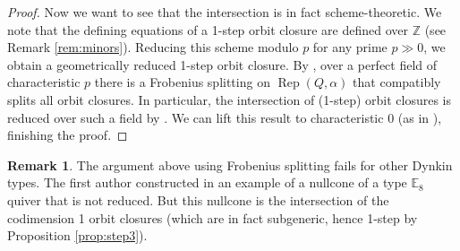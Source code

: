 \documentclass[twoside]{article}
\newcommand{\integ}{\mathbb{Z}}
\newcommand{\Rep}{\operatorname{Rep}}
\theoremstyle{definition}
\newtheorem{remark}[theorem]{Remark}
\begin{document}
\begin{proof}
Now we want to see that the intersection is in fact scheme-theoretic. We note that the defining equations of a 1-step orbit closure are defined over $\integ$ (see Remark \ref{rem:minors}). Reducing this scheme modulo $p$ for any prime $p\gg 0$, we obtain a geometrically reduced 1-step orbit closure.  By \cite{ryan}, over a perfect field of characteristic $p$ there is a Frobenius splitting on $\Rep(Q,\alpha)$ that compatibly splits all orbit closures. In particular, the intersection of (1-step) orbit closures is reduced over such a field by \cite[Proposition 1.2.1]{briku}. We can lift this result to characteristic $0$ (as in \cite[Corollary 1.6.6]{briku}), finishing the proof.
\end{proof}

\begin{remark} The argument above using Frobenius splitting fails for other Dynkin types. The first author constructed in \cite{lol} an example of a nullcone of a type $\mathbb{E}_8$ quiver that is not reduced. But this nullcone is the intersection of the codimension 1 orbit closures (which are in fact subgeneric, hence 1-step by Proposition \ref{prop:step3}).
\end{remark}



\end{document}

